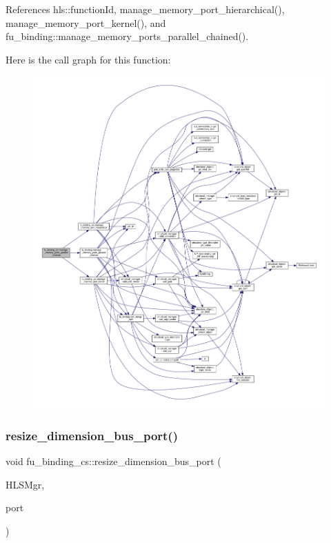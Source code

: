 References hls\+::function\+Id, manage\+\_\+memory\+\_\+port\+\_\+hierarchical(), manage\+\_\+memory\+\_\+port\+\_\+kernel(), and fu\+\_\+binding\+::manage\+\_\+memory\+\_\+ports\+\_\+parallel\+\_\+chained().

Here is the call graph for this function\+:
\nopagebreak
\begin{figure}[H]
\begin{center}
\leavevmode
\includegraphics[width=350pt]{d4/d7b/classfu__binding__cs_a11b4e8a8b74e18bf3c73c2c535471270_cgraph}
\end{center}
\end{figure}
\mbox{\label{classfu__binding__cs_a2858be239990d67661b459950778380d}} 
\subsubsection{\texorpdfstring{resize\+\_\+dimension\+\_\+bus\+\_\+port()}{resize\_dimension\_bus\_port()}}
{\footnotesize\ttfamily void fu\+\_\+binding\+\_\+cs\+::resize\+\_\+dimension\+\_\+bus\+\_\+port (\begin{DoxyParamCaption}\item[{const \hyperlink{hls__manager_8hpp_acd3842b8589fe52c08fc0b2fcc813bfe}{H\+L\+S\+\_\+manager\+Ref}}]{H\+L\+S\+Mgr,  }\item[{\hyperlink{structural__objects_8hpp_a8ea5f8cc50ab8f4c31e2751074ff60b2}{structural\+\_\+object\+Ref}}]{port }\end{DoxyParamCaption})\hspace{0.3cm}{\ttfamily [protected]}}



